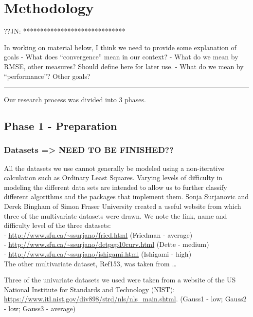 \hypertarget{methodology}{%
\section{Methodology}\label{methodology}}

??JN: ******************************

In working on material below, I think we need to provide some
explanation of goals - What does ``convergence'' mean in our context? -
What do we mean by RMSE, other measures? Should define here for later
use. - What do we mean by ``performance''? Other goals?

\begin{center}\rule{0.5\linewidth}{0.5pt}\end{center}

Our research process was divided into 3 phases.

\hypertarget{phase-1---preparation}{%
\subsection{Phase 1 - Preparation}\label{phase-1---preparation}}

\hypertarget{datasets-need-to-be-finished}{%
\subsubsection{Datasets =\textgreater{} NEED TO BE
FINISHED??}\label{datasets-need-to-be-finished}}

All the datasets we use cannot generally be modeled using a
non-iterative calculation such as Ordinary Least Squares. Varying levels
of difficulty in modeling the different data sets are intended to allow
us to further classify different algorithms and the packages that
implement them. Sonja Surjanovic and Derek Bingham of Simon Fraser
University created a useful website from which three of the multivariate
datasets were drawn. We note the link, name and difficulty level of the
three datasets:\\
- \url{http://www.sfu.ca/~ssurjano/fried.html} (Friedman - average)\\
- \url{http://www.sfu.ca/~ssurjano/detpep10curv.html} (Dette - medium)\\
- \url{http://www.sfu.ca/~ssurjano/ishigami.html} (Ishigami - high)\\
The other multivariate dataset, Ref153, was taken from \ldots{}

Three of the univariate datasets we used were taken from a website of
the US National Institute for Standards and Technology (NIST):
\url{https://www.itl.nist.gov/div898/strd/nls/nls_main.shtml}. (Gauss1 -
low; Gauss2 - low; Gauss3 - average)

